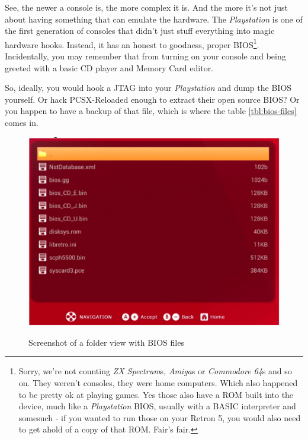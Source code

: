 \documentclass[a4paper]{article}
\begin{document}
See, the newer a console is, the more complex it is. And the more it's not just about having something that can emulate the hardware. The \emph{Playstation} is one of the first generation of consoles that didn't just stuff everything into magic hardware hooks. Instead, it has an honest to goodness, proper BIOS\footnote{Sorry, we're not counting \emph{ZX Spectrum}s, \emph{Amiga}s or \emph{Commodore 64}s and so on. They weren't consoles, they were home computers. Which also happened to be pretty ok at playing games. Yes those also have a ROM built into the device, much like a \emph{Playstation} BIOS, usually with a BASIC interpreter and somesuch - if you wanted to run those on your Retron 5, you would also need to get ahold of a copy of that ROM. Fair's fair.}. Incidentally, you may remember that from turning on your console and being greeted with a basic CD player and Memory Card editor.

So, ideally, you would hook a JTAG into your \emph{Playstation} and dump the BIOS yourself. Or hack PCSX-Reloaded enough to extract their open source BIOS? Or you happen to have a backup of that file, which is where the table \ref{tbl:bios-files} comes in.

\begin{figure}[h]
\caption{Screenshot of a folder view with BIOS files}
\includegraphics[width=\textwidth]{needed-files-for-alternate-cores}
\label{fig:needed-files-for-alternate-cores}
\end{figure}
\end{document}
